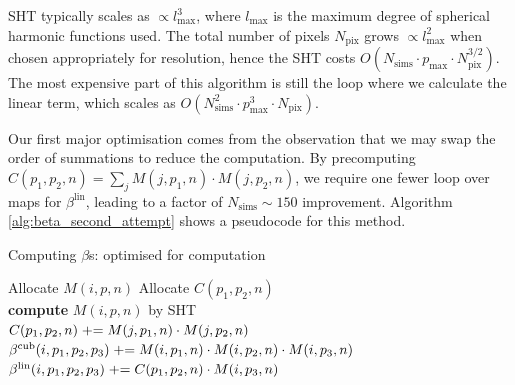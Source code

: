 SHT typically scales as $\propto l_\text{max}^3$, where $l_\text{max}$ is the maximum degree of spherical harmonic functions used. The total number of pixels $N_\text{pix}$ grows $\propto l_\text{max}^2$ when chosen appropriately for resolution, hence the SHT costs $O(N_\text{sims}\cdot p_\text{max} \cdot N_\text{pix}^{3/2})$. The most expensive part of this algorithm is still the loop where we calculate the linear term, which scales as $O(N_\text{sims}^2 \cdot p_\text{max}^3 \cdot N_\text{pix})$.

Our first major optimisation comes from the observation that we may swap the order of summations to reduce the computation. By precomputing $C(p_1, p_2, n) = \sum_j M(j,p_1,n) \cdot M(j,p_2,n)$, we require one fewer loop over maps for $\beta^\text{lin}$, leading to a factor of $N_\text{sims}\sim150$ improvement. Algorithm \ref{alg:beta_second_attempt} shows a pseudocode for this method.

\begin{algorithm}[htbp]
	\caption{Computing $\beta$s: optimised for computation}
	\label{alg:beta_second_attempt}
	\begin{algorithmic}[1] %
		\State Allocate $M(i,p,n)$ 
		\State Allocate $C(p_1,p_2,n)$ 
		\\
				\State \textbf{compute} $M(i,p,n)$ by SHT
			\EndFor
		\EndFor {}
		\\
					\State $C(p_1,p_2,n) \mathrel{+}= M(j,p_1,n) \cdot M(j,p_2,n)$
				\EndFor
			\EndFor
		\EndFor {}
		\\
					\State $\beta^\text{cub}(i, p_1, p_2, p_3) \mathrel{+}= M(i, p_1, n) \cdot M(i, p_2, n) \cdot M(i, p_3, n)$
					\State $\beta^\text{lin}(i, p_1, p_2, p_3) \mathrel{+}= C(p_1, p_2, n) \cdot M(i, p_3, n)$
				\EndFor
			\EndFor
		\EndFor
	\end{algorithmic}
\end{algorithm}

